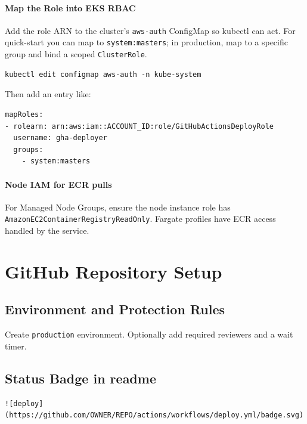 \documentclass[11pt]{article}
\begin{document}
\paragraph{Map the Role into EKS RBAC}
Add the role ARN to the cluster's \texttt{aws-auth} ConfigMap so kubectl can act. For quick-start you can map to \texttt{system:masters}; in production, map to a specific group and bind a scoped \texttt{ClusterRole}.

\begin{verbatim}
kubectl edit configmap aws-auth -n kube-system
\end{verbatim}

Then add an entry like:
\begin{verbatim}
mapRoles:
- rolearn: arn:aws:iam::ACCOUNT_ID:role/GitHubActionsDeployRole
  username: gha-deployer
  groups:
    - system:masters
\end{verbatim}

\paragraph{Node IAM for ECR pulls}
For Managed Node Groups, ensure the node instance role has \texttt{AmazonEC2ContainerRegistryReadOnly}. Fargate profiles have ECR access handled by the service.

\section{GitHub Repository Setup}
\subsection{Environment and Protection Rules}
Create \texttt{production} environment. Optionally add required reviewers and a wait timer.

\subsection{Status Badge in readme}
\begin{verbatim}
![deploy](https://github.com/OWNER/REPO/actions/workflows/deploy.yml/badge.svg)
\end{verbatim}
\clearpage
\end{document}
